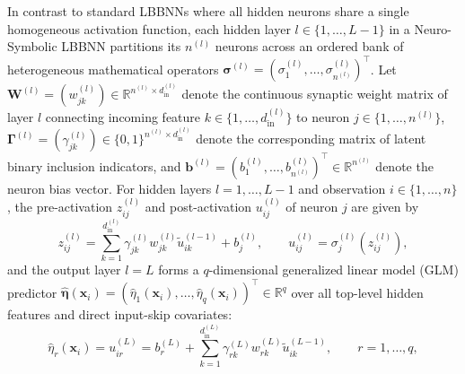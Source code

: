\documentclass[11pt,a4paper]{article}
\begin{document}
In contrast to standard LBBNNs where all hidden neurons share a single homogeneous activation function, each hidden layer $l \in \{1, \dots, L-1\}$ in a Neuro-Symbolic LBBNN partitions its $n^{(l)}$ neurons across an ordered bank of heterogeneous mathematical operators $\bm{\sigma}^{(l)} = (\sigma_1^{(l)}, \dots, \sigma_{n^{(l)}}^{(l)})^\top$. Let $\bm{W}^{(l)} = (w_{jk}^{(l)}) \in \mathbb{R}^{n^{(l)} \times d_{\text{in}}^{(l)}}$ denote the continuous synaptic weight matrix of layer $l$ connecting incoming feature $k \in \{1, \dots, d_{\text{in}}^{(l)}\}$ to neuron $j \in \{1, \dots, n^{(l)}\}$, $\bm{\Gamma}^{(l)} = (\gamma_{jk}^{(l)}) \in \{0, 1\}^{n^{(l)} \times d_{\text{in}}^{(l)}}$ denote the corresponding matrix of latent binary inclusion indicators, and $\bm{b}^{(l)} = (b_1^{(l)}, \dots, b_{n^{(l)}}^{(l)})^\top \in \mathbb{R}^{n^{(l)}}$ denote the neuron bias vector. For hidden layers $l = 1, \dots, L-1$ and observation $i \in \{1, \dots, n\}$, the pre-activation $z_{ij}^{(l)}$ and post-activation $u_{ij}^{(l)}$ of neuron $j$ are given by
\begin{equation}
\label{eq:layer_forward}
z_{ij}^{(l)} = \sum_{k=1}^{d_{\text{in}}^{(l)}} \gamma_{jk}^{(l)} w_{jk}^{(l)} \tilde{u}_{ik}^{(l-1)} + b_j^{(l)}, \qquad u_{ij}^{(l)} = \sigma_j^{(l)}\!\left(z_{ij}^{(l)}\right),
\end{equation}
and the output layer $l = L$ forms a $q$-dimensional generalized linear model (GLM) predictor $\hat{\bm{\eta}}(\bm{x}_i) = (\hat{\eta}_1(\bm{x}_i), \dots, \hat{\eta}_q(\bm{x}_i))^\top \in \mathbb{R}^q$ over all top-level hidden features and direct input-skip covariates:
\begin{equation}
\label{eq:output_readout}
\hat{\eta}_r(\bm{x}_i) = u_{ir}^{(L)} = b_r^{(L)} + \sum_{k=1}^{d_{\text{in}}^{(L)}} \gamma_{rk}^{(L)} w_{rk}^{(L)} \tilde{u}_{ik}^{(L-1)}, \qquad r = 1, \dots, q,
\end{equation}
\end{document}
